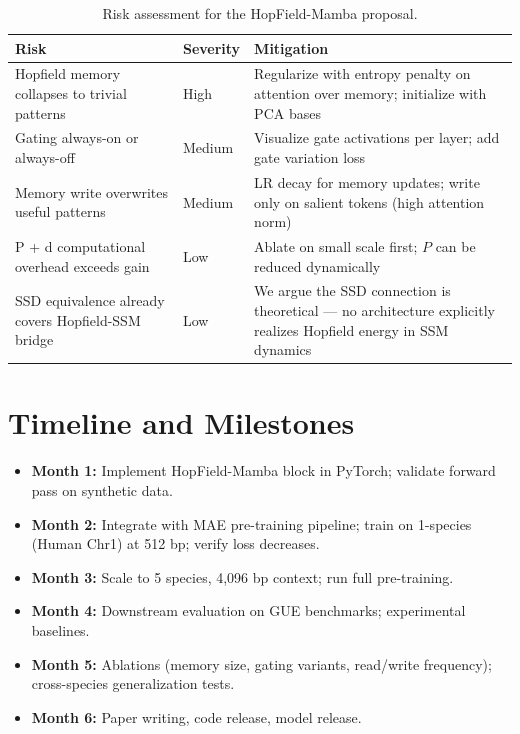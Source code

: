 \documentclass[11pt,a4paper]{article}
\numberwithin{equation}{section}
\begin{document}
\begin{table}[H]
\centering
\caption{Risk assessment for the HopField-Mamba proposal.}
\label{tab:risks}
\small
\begin{tabular}{p{4cm}p{4cm}p{5cm}}
\toprule
\textbf{Risk} & \textbf{Severity} & \textbf{Mitigation} \\
\midrule
Hopfield memory collapses to trivial patterns & High & Regularize with entropy penalty on
attention over memory; initialize with PCA bases \\
Gating always-on or always-off & Medium & Visualize gate activations per layer;
add gate variation loss \\
Memory write overwrites useful patterns & Medium & LR decay for memory updates;
write only on salient tokens (high attention norm) \\
P + d computational overhead exceeds gain & Low & Ablate on small scale first;
$P$ can be reduced dynamically \\
SSD equivalence already covers Hopfield-SSM bridge & Low & We argue the SSD connection
is theoretical --- no architecture explicitly realizes Hopfield energy in SSM dynamics \\
\bottomrule
\end{tabular}
\end{table}

\section{Timeline and Milestones}
\label{sec:timeline}

\begin{itemize}
    \item \textbf{Month 1:} Implement HopField-Mamba block in PyTorch; validate forward
    pass on synthetic data.
    \item \textbf{Month 2:} Integrate with MAE pre-training pipeline; train on
    1-species (Human Chr1) at 512 bp; verify loss decreases.
    \item \textbf{Month 3:} Scale to 5 species, 4,096 bp context; run full pre-training.
    \item \textbf{Month 4:} Downstream evaluation on GUE benchmarks; experimental
    baselines.
    \item \textbf{Month 5:} Ablations (memory size, gating variants, read/write
    frequency); cross-species generalization tests.
    \item \textbf{Month 6:} Paper writing, code release, model release.
\end{itemize}
\end{document}
